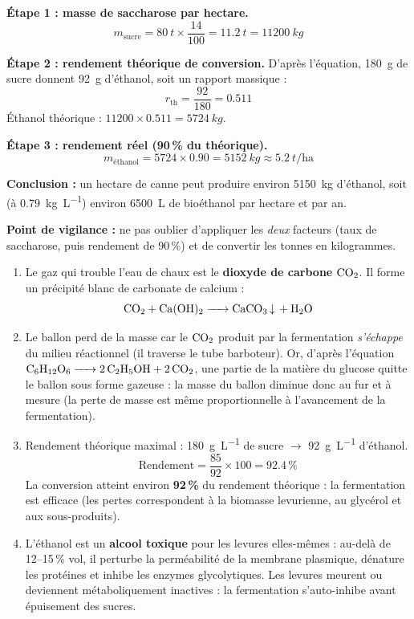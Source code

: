 \documentclass[11pt]{article}
\begin{document}
\begin{corrige}
\textbf{Étape 1 : masse de saccharose par hectare.}
\[ m_{\text{sucre}} = \SI{80}{t} \times \frac{14}{100} = \SI{11,2}{t} = \SI{11200}{kg} \]

\textbf{Étape 2 : rendement théorique de conversion.} D'après l'équation, \SI{180}{g} de sucre donnent \SI{92}{g} d'éthanol, soit un rapport massique :
\[ r_{\text{th}} = \frac{92}{180} = \num{0,511} \]
Éthanol théorique : $11200 \times \num{0,511} = \SI{5724}{kg}$.

\textbf{Étape 3 : rendement réel (90\,\% du théorique).}
\[ m_{\text{éthanol}} = 5724 \times \num{0,90} = \SI{5152}{kg} \approx \SI{5,2}{t\per\hectare} \]

\textbf{Conclusion :} un hectare de canne peut produire environ \SI{5150}{kg} d'éthanol, soit (à \SI{0,79}{kg\per\liter}) environ \SI{6500}{L} de bioéthanol par hectare et par an.

\textbf{Point de vigilance :} ne pas oublier d'appliquer les \emph{deux} facteurs (taux de saccharose, puis rendement de 90\,\%) et de convertir les tonnes en kilogrammes.
\end{corrige}

\begin{corrige}
\begin{enumerate}
\item Le gaz qui trouble l'eau de chaux est le \textbf{dioxyde de carbone} $\ce{CO2}$. Il forme un précipité blanc de carbonate de calcium :
\[ \ce{CO2 + Ca(OH)2 -> CaCO3 v + H2O} \]
\item Le ballon perd de la masse car le $\ce{CO2}$ produit par la fermentation \emph{s'échappe} du milieu réactionnel (il traverse le tube barboteur). Or, d'après l'équation $\ce{C6H12O6 -> 2 C2H5OH + 2 CO2}$, une partie de la matière du glucose quitte le ballon sous forme gazeuse : la masse du ballon diminue donc au fur et à mesure (la perte de masse est même proportionnelle à l'avancement de la fermentation).
\item Rendement théorique maximal : \SI{180}{g\per\liter} de sucre $\rightarrow$ \SI{92}{g\per\liter} d'éthanol.
\[ \text{Rendement} = \frac{85}{92} \times 100 = \num{92,4}\,\% \]
La conversion atteint environ \textbf{92\,\%} du rendement théorique : la fermentation est efficace (les pertes correspondent à la biomasse levurienne, au glycérol et aux sous-produits).
\item L'éthanol est un \textbf{alcool toxique} pour les levures elles-mêmes : au-delà de 12--15\,\% vol, il perturbe la perméabilité de la membrane plasmique, dénature les protéines et inhibe les enzymes glycolytiques. Les levures meurent ou deviennent métaboliquement inactives : la fermentation s'auto-inhibe avant épuisement des sucres.
\end{enumerate}
\end{corrige}
\end{document}
